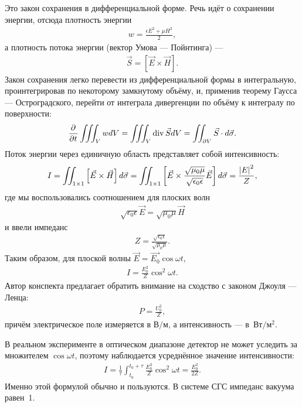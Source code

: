 Это закон сохранения в дифференциальной форме. Речь идёт о сохранении энергии,
отсюда плотность энергии
\begin{align*}
  w = 
  \frac{\epsilon E^2 + \mu H^2}{2},
\end{align*}
а плотность потока энергии (вектор Умова --- Пойнтинга) ---
\begin{align*}
  \vec{S} = \left[\vec{E} \times \vec{H}\right].
\end{align*}
Закон сохранения легко перевести из дифференциальной формы в интегральную,
проинтегрировав по некоторому замкнутому объёму, и, применив теорему Гаусса ---
Остроградского, перейти от интеграла дивергенции по объёму к интегралу по
поверхности:
\begin{align*}
  \frac{\partial^{} }{\partial t^{}}\iiint_{V} w dV = 
  \iiint_{V} \operatorname*{div}\vec{S} dV = 
  \iint_{\partial V} \vec{S} \cdot d\vec{\sigma}.
\end{align*}
Поток энергии через единичную область представляет собой интенсивность:
\begin{align*}
  I = 
  \iint_{1\times 1} \left[\vec{E} \times \vec{H}\right] d\vec{\sigma} = 
  \iint_{1\times 1} \left[\vec{E} \times
  \frac{\sqrt{\mu_0\mu}}{\sqrt{\epsilon_0\epsilon}}\vec{E}\right] d\vec{\sigma} = \frac{\left\lvert E \right\rvert^2}{Z},
\end{align*}
где мы воспользовались соотношением для плоских волн
\begin{align*}
  \sqrt{\epsilon_0\epsilon}\vec{E} = \sqrt{\mu_0\mu}\vec{H}
\end{align*}
и ввели импеданс
\begin{align*}
  Z = \frac{\sqrt{\epsilon_0\epsilon}}{\sqrt{\mu_0\mu}}.
\end{align*}
Таким образом, для плоской волны \(\vec{E} = \vec{E_0}\cos{\omega t}\),
\begin{align*}
  I = \frac{E_0^2}{Z} \cos^2\omega t.
\end{align*}
Автор конспекта предлагает обратить внимание на сходство с законом Джоуля ---
Ленца:
\begin{align*}
  P = \frac{U_0^2}{Z},
\end{align*}
причём электрическое поле измеряется в \(\text{В}/\text{м}\), а интенсивность ---
в~\(\text{Вт}/\text{м}^2\).

В реальном эксперименте в оптическом диапазоне детектор не может уследить за
множителем \(\cos\omega t\), поэтому наблюдается усреднённое значение
интенсивности:
\begin{align*}
  I = \frac{1}{\tau}\int_{t_0}^{t_0 + \tau}\frac{E_0^2}{Z} \cos^2\omega
  t = \frac{E_0^2}{2Z}.
\end{align*}
Именно этой формулой обычно и пользуются. В системе СГС импеданс вакуума равен~1.


